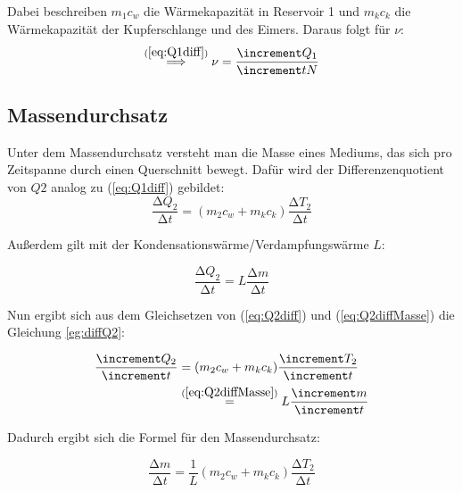 Dabei beschreiben $m_{1} c_{w}$ die Wärmekapazität in Reservoir 1 und $m_{k} c_{k}$ die Wärmekapazität der Kupferschlange und des Eimers.
Daraus folgt für $\nu$:
\begin{equation} \label{eq:emp_nu}
    \stackrel{(\ref{eq:Q1diff})}{\implies} \nu = \frac{\increment Q_{1}}{\increment t N}
\end{equation}


\subsection{Massendurchsatz}

Unter dem Massendurchsatz versteht man die Masse eines Mediums, das sich pro Zeitspanne durch einen Querschnitt bewegt.
Dafür wird der Differenzenquotient von $Q{2}$ analog zu (\ref{eq:Q1diff}) gebildet:
\begin{equation} \label{eq:Q2diff}
    \frac{\increment Q_{2}}{\increment t} = (m_{2} c_{w} + m_{k} c_{k}) \frac{\increment T_{2}}{\increment t}
\end{equation}

Außerdem gilt mit der Kondensationswärme/Verdampfungswärme $L$:

\begin{equation} \label{eq:Q2diffMasse}
    \frac{\increment Q_{2}}{\increment t} = L \frac{\increment m}{\increment t}
\end{equation}

Nun ergibt sich aus dem Gleichsetzen von (\ref{eq:Q2diff}) und (\ref{eq:Q2diffMasse}) die Gleichung \ref{eg:diffQ2}:

\begin{align} \label{eg:diffQ2}
    \begin{split}
        \frac{\increment Q_{2}}{\increment t} & = (m_{2} c_{w} + m_{k} c_{k}) \frac{\increment T_{2}}{\increment t} \\
            & \stackrel{(\ref{eq:Q2diffMasse})}{=} L \frac{\increment m}{\increment t}
    \end{split}
\end{align}

Dadurch ergibt sich die Formel für den Massendurchsatz:

\begin{equation} \label{eq:massendurchsatz}
    \frac{\increment m}{\increment t} = \frac{1}{L} (m_{2} c_{w} + m_{k} c_{k}) \frac{\increment T_{2}}{\increment t}
\end{equation}


